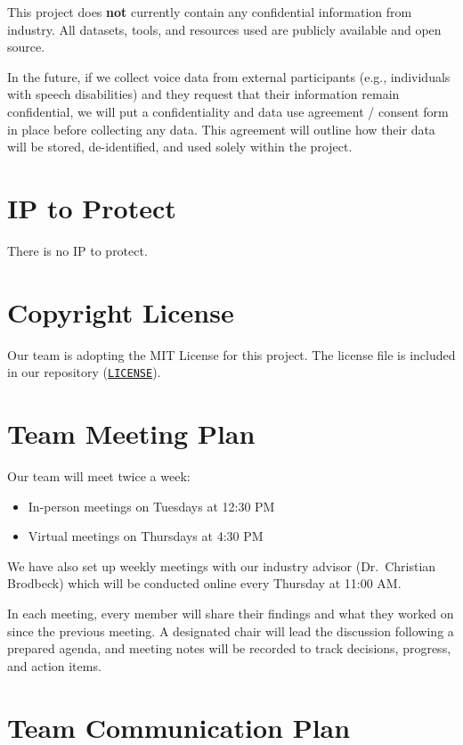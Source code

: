 \documentclass{article}
\begin{document}
This project does \textbf{not} currently contain any confidential information from industry. All datasets, tools, and resources used are publicly available and open source.

In the future, if we collect voice data from external participants (e.g., individuals with speech disabilities) and they request that their information remain confidential, we will put a confidentiality and data use agreement / consent form in place before collecting any data. This agreement will outline how their data will be stored, de-identified, and used solely within the project.


\section{IP to Protect}



There is no IP to protect.

\section{Copyright License}

Our team is adopting the MIT License for this project. The license file is included in our repository 
(\href{https://github.com/speech-buddies/VoiceBridge/blob/main/LICENSE}{\texttt{LICENSE}}).

\section{Team Meeting Plan}

Our team will meet twice a week:

\begin{itemize}
    \item In-person meetings on Tuesdays at 12:30 PM
    \item Virtual meetings on Thursdays at 4:30 PM
\end{itemize}

We have also set up weekly meetings with our industry advisor (Dr.~Christian Brodbeck) which will be conducted online every Thursday at 11:00 AM.

In each meeting, every member will share their findings and what they worked on since the previous meeting. A designated chair will lead the discussion following a prepared agenda, and meeting notes will be recorded to track decisions, progress, and action items.

\section{Team Communication Plan}
\end{document}
